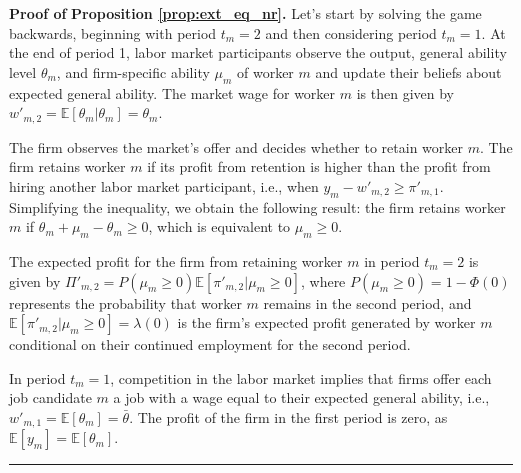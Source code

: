 \documentclass[12pt]{article}
\newenvironment{proof}[1][Proof of]{\noindent\textbf{#1} }{\ \rule{0.5em}{0.5em}}
\begin{document}
\begin{proof}
    \textbf{Proposition \ref{prop:ext_eq_nr}.}
    Let's start by solving the game backwards, beginning with period $t_m = 2$ and then considering period $t_m = 1$. At the end of period 1, labor market participants observe the output, general ability level $\theta_m$, and firm-specific ability $\mu_m$ of worker $m$ and update their beliefs about expected general ability. The market wage for worker $m$ is then given by $w'_{m,2} = \mathbb{E}[\theta_m | \theta_m] = \theta_m$.

    The firm observes the market's offer and decides whether to retain worker $m$. The firm retains worker $m$ if its profit from retention is higher than the profit from hiring another labor market participant, i.e., when $y_m - w'_{m,2} \geq \pi'_{m,1}$. Simplifying the inequality, we obtain the following result: the firm retains worker $m$ if $\theta_m + \mu_m - \theta_m \geq 0$, which is equivalent to $\mu_m \geq 0$.

    The expected profit for the firm from retaining worker $m$ in period $t_m = 2$ is given by $\Pi'_{m,2} = P(\mu_m \geq 0)\mathbb{E}[\pi'_{m,2}|\mu_m \geq 0]$, where $P(\mu_m \geq 0) = 1- \Phi(0)$ represents the probability that worker $m$ remains in the second period, and $\mathbb{E}[\pi'_{m,2}|\mu_m \geq 0] = \lambda(0)$ is the firm's expected profit generated by worker $m$ conditional on their continued employment for the second period.

    In period $t_m = 1$, competition in the labor market implies that firms offer each job candidate $m$ a job with a wage equal to their expected general ability, i.e., $w'_{m,1} = \mathbb{E}[\theta_m] = \bar{\theta}$. The profit of the firm in the first period is zero, as $\mathbb{E}[y_m] = \mathbb{E}[\theta_m]$.
\end{proof}
\end{document}

